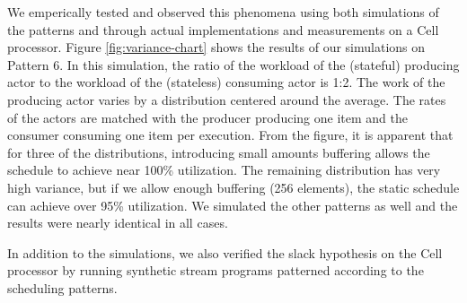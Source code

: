 We emperically tested and observed this phenomena using both
simulations of the patterns and through actual implementations and
measurements on a Cell processor.  Figure \ref{fig:variance-chart}
shows the results of our simulations on Pattern 6.  In this
simulation, the ratio of the workload of the (stateful) producing
actor to the workload of the (stateless) consuming actor is 1:2. The
work of the producing actor varies by a distribution centered around
the average. The rates of the actors are matched with the producer
producing one item and the consumer consuming one item per execution.
From the figure, it is apparent that for three of the distributions,
introducing small amounts buffering allows the schedule to achieve
near 100\% utilization.  The remaining distribution has very high
variance, but if we allow enough buffering (256 elements), the static
schedule can achieve over 95\% utilization. We simulated the other
patterns as well and the results were nearly identical in all
cases.

In addition to the simulations, we also verified the slack hypothesis
on the Cell processor by running synthetic stream programs patterned
according to the scheduling patterns.

